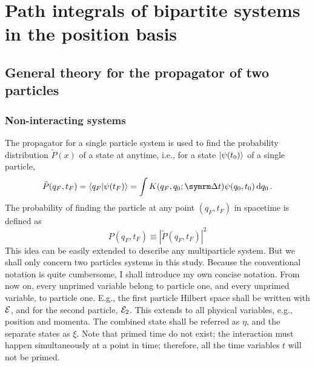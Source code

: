 \chapter{Path integrals of bipartite systems in the position basis}

\section{General theory for the propagator of two particles}

\subsection{Non-interacting systems}

The propagator for a single particle system is used to find the probability distribution $\tilde{P}(x)$ of a state at anytime, i.e., for a state $\ket{\psi(t_0)}$ of a single particle,
\begin{equation}
    \tilde{P}(q_F, t_F) = \braket{q_F}{\psi(t_F)} = \int K(q_F, q_0; \Dd{t})\psi(q_0, t_0)\dd{q_0}.
\end{equation}
The probability of finding the particle at any point $(q_F, t_F)$ in spacetime is defined as
\begin{equation}
    P(q_F, t_F) \equiv |\tilde{P}(q_F, t_F)|^2
\end{equation}
This idea can be easily extended to describe any multiparticle system. But we shall only concern two particles systems in this study. Because the conventional notation is quite cumbersome, I shall introduce my own concise notation. From now on, every unprimed variable belong to particle one, and every unprimed variable, to particle one. E.g., the first particle Hilbert space shall be written with $\mathcal{E}$, and for the second particle, $\mathcal{E}_2$. This extends to all physical variables, e.g., position and momenta. The combined state shall be referred as $\eta$, and the separate states as $\xi$. Note that primed time do not exist; the interaction must happen simultaneously at a point in time; therefore, all the time variables $t$ will not be primed.

